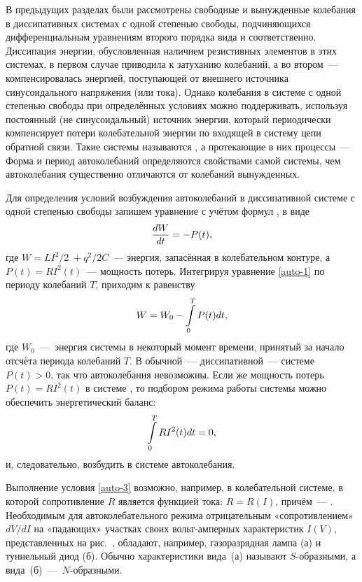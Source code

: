 
В предыдущих разделах были рассмотрены свободные и вынужденные колебания в
диссипативных системах с одной степенью свободы, подчиняющихся дифференциальным
уравнениям второго порядка вида  и 
соответственно. Диссипация энергии, обусловленная наличием резистивных элементов
в этих системах, в первом случае приводила к затуханию колебаний, а во
втором~--- компенсировалась энергией, поступающей от
внешнего источника синусоидального напряжения (или тока). Однако колебания в
системе с одной степенью свободы при определённых условиях можно поддерживать,
используя постоянный (не синусоидальный) источник энергии, который периодически
компенсирует потери колебательной энергии по входящей в систему цепи обратной
связи. Такие системы называются , а протекающие в
них процессы~---  Форма и период автоколебаний
определяются свойствами самой системы, чем автоколебания существенно отличаются
от колебаний вынужденных.

Для определения условий возбуждения автоколебаний в диссипативной системе с
одной степенью свободы запишем уравнение  с учётом формул
,  в виде
\begin{equation}
	\eqmark{auto-1}
	\frac{dW}{dt}=-P(t),
\end{equation}
где $W={LI^2}/{2}\;+{q^2}/{2C}$~--- энергия, запасённая в колебательном контуре,
а $P(t)=R{{I}^{2}}(t)$~--- мощность потерь. Интегрируя уравнение \eqref{auto-1}
по периоду колебаний $T$, приходим к равенству
\begin{equation}
	\eqmark{auto-2}
	W=W_0-\int\limits_{0}^{T}P(t)dt,
\end{equation}
где $W_0$~---~энергия системы в некоторый момент времени, принятый за начало
отсчёта периода колебаний $T$. В обычной~--- диссипативной~--- системе $P(t)>0$,
так что автоколебания невозможны. Если же мощность потерь $P(t)=R{{I}^{2}}(t)$ в
системе , то подбором режима работы системы можно
обеспечить энергетический баланс:
\begin{equation}
	\eqmark{auto-3}
	\int\limits_{0}^{T}{R{{I}^{2}}(t)dt}=0,
\end{equation}
и, следовательно, возбудить в системе автоколебания.

Выполнение условия \eqref{auto-3} возможно, например, в 
колебательной системе, в которой сопротивление $R$ является функцией тока:
$R=R(I)$, причём~--- . Необходимым для
автоколебательного режима отрицательным «сопротивлением» ${dV}/{dI}$ на
«падающих» участках своих вольт-амперных характеристик $I(V)$, представленных на
рис.~, обладают, например, газоразрядная лампа (а) и туннельный
диод (б). Обычно характеристики вида~(а) называют $S$-образными, а
вида~(б)~---~$N$-образными.

